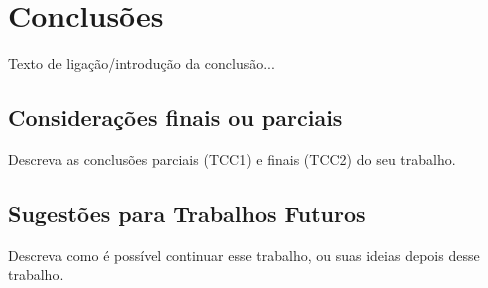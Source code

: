 \chapter{Conclusões}
\label{cap:conclusoes}

Texto de ligação/introdução da conclusão...

\section{Considerações finais ou parciais}
\label{cap:conclusoes:sec:consideracoes:finais:parciais}

Descreva as conclusões parciais (TCC1) e finais (TCC2) do seu trabalho.

\section{Sugestões para Trabalhos Futuros}
\label{cap:conclusoes:sec:trabalhos:futuros}

Descreva como é possível continuar esse trabalho, ou suas ideias depois desse trabalho.